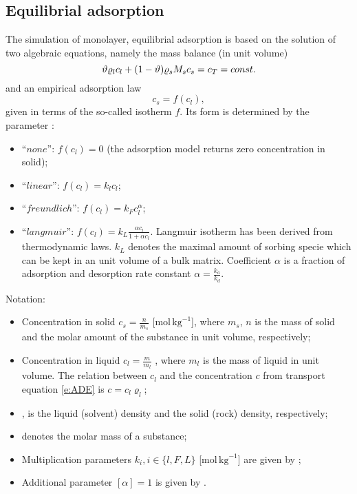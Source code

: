 \subsection{Equilibrial adsorption}
\label{sec:sorp_math}

The simulation of monolayer, equilibrial adsorption is based on the solution of two algebraic equations, namely the mass balance (in unit volume)
\begin{equation}
\label{eq:mass_balance_sorption}
\th \varrho_l c_l + (1-\th) \varrho_s M_s c_s = c_T = const.
\end{equation}
and an empirical adsorption law
\begin{equation}
\label{eq:relation_cs_cl}
c_s = f(c_l),
\end{equation}
given in terms of the so-called isotherm $f$.
Its form is determined by the parameter :
\begin{itemize}
 \item ``$none$'': $f(c_l)=0$ (the adsorption model returns zero concentration in solid);
 \item ``$linear$'': $f(c_l) = k_l c_l$;
 \item ``$freundlich$'': $f(c_l) = k_F c_l^{\alpha}$;
 \item ``$langmuir$'': $f(c_l) = k_L \frac{\alpha c_l}{1 + \alpha c_l}$.
       Langmuir isotherm has been derived from thermodynamic laws. $k_L$ denotes the maximal amount 
       of sorbing specie which can be kept in an unit volume of a bulk matrix. Coefficient $\alpha$ is 
       a fraction of adsorption and desorption rate constant $\alpha = \frac{k_a}{k_d}$.
\end{itemize}

Notation:
\begin{itemize}
 \item Concentration in solid $c_s = \frac{n}{m_s}$ [mol\,$\mathrm{kg}^{-1}$], where $m_s$, $n$ is the 
       mass of solid and the molar amount of the substance in unit volume, respectively;
 \item Concentration in liquid $c_l = \frac{m}{m_l}$ \units{}{}{}, where $m_l$ is 
       the mass of liquid in unit volume. The relation between $c_l$ and the concentration $c$ from 
       transport equation \eqref{e:ADE} is $c = c_l \varrho_l$;
 \item {},  is the liquid (solvent) density and the solid (rock) density, respectively;
 \item {} denotes the molar mass of a substance;
 \item Multiplication parameters $k_i, i\in\{ l,F,L\}$ [mol\,$\mathrm{kg}^{-1}$] are given by 
       ;
 \item Additional parameter $[\alpha] = 1$ is given by .
\end{itemize}


